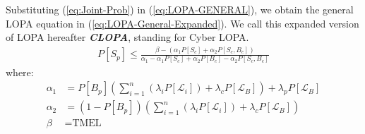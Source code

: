 \documentclass[journal]{IEEEtran}
\begin{document}
Substituting (\ref{eq:Joint-Prob}) in (\ref{eq:LOPA-GENERAL}), we obtain the general LOPA equation in (\ref{eq:LOPA-General-Expanded}). We call this expanded version of LOPA hereafter \emph{\textbf{CLOPA}}, standing for Cyber LOPA.
\begin{align}     
P[S_p] \leq \frac{\beta - (\alpha_1 P[S_c] + \alpha_2 P[S_c,B_c])}{\alpha_1 - \alpha_1 P[S_c] + \alpha_2 P[B_c] - \alpha_2 P[S_c,B_c]}
\label{eq:LOPA-General-Expanded}
\end{align}
where:
\begin{align}
\alpha_1 &= P[B_p] \left( \sum_{i=1}^n \left( \lambda_i P[\mathcal{L}_i] \right) + \lambda_c P[\mathcal{L}_B] \right) + \lambda_p P[\mathcal{L}_B] \label{eq:alpha1}\\
\alpha_2 &= (1-P[B_p]) \left( \sum_{i=1}^n \left( \lambda_i P[\mathcal{L}_i] \right) +  \lambda_c P[\mathcal{L}_B] \right) \label{eq:alpha2}\\
\beta &= \text{TMEL} \label{eq:beta}
\end{align}
\end{document}
